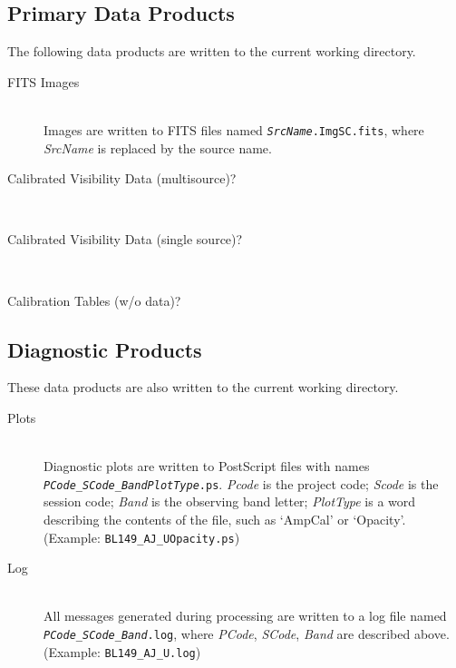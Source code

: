 \documentclass[10pt,onecolumn,final]{IEEEtran}
\begin{document}
\subsection{Primary Data Products}

The following data products are written to the current working directory.

\begin{description}
\item[FITS Images] \hfill \\ Images are written to FITS files named {\tt{\em SrcName}.ImgSC.fits}, where {\em SrcName} is replaced by the source name.

\item[Calibrated Visibility Data (multisource)?] \hfill \\ 

\item[Calibrated Visibility Data (single source)?] \hfill \\ 

\item[Calibration Tables (w/o data)?] \hfill %
\end{description}

\subsection{Diagnostic Products}

These data products are also written to the current working directory.

\begin{description}

\item[Plots] \hfill \\  Diagnostic plots are written to PostScript files with names {\tt {\em PCode}\_{\em SCode}\_{\em Band}{\em PlotType}.ps}.  {\em Pcode} is the project code; {\em Scode} is the session code; {\em Band} is the observing band letter; {\em PlotType} is a word describing the contents of the file, such as `AmpCal' or `Opacity'.  (Example: {\tt BL149\_AJ\_UOpacity.ps}) 
 
\item[Log] \hfill \\ All messages generated during processing are written to a log file named {\tt {\em PCode}\_{\em SCode}\_{\em Band}.log}, where {\em PCode}, {\em SCode}, {\em Band} are described above.  (Example: {\tt BL149\_AJ\_U.log})

\end{description}
\end{document}
